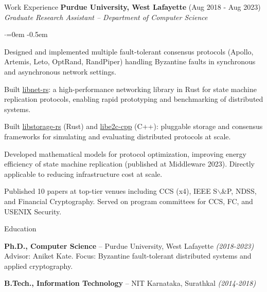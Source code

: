\documentclass{resume}
\begin{document}
\begin{rSection}{Work Experience}
\textbf{Purdue University, West Lafayette}  \hfill  (Aug 2018 - Aug 2023)\\
\emph{Graduate Research Assistant -- Department of Computer Science}
\begin{list}{$\cdot$}{\leftmargin=0em}
\itemsep -0.5em \vspace{-0.5em}
 \item  Designed and implemented multiple fault-tolerant consensus protocols (Apollo, Artemis, Leto, OptRand, RandPiper) handling Byzantine faults in synchronous and asynchronous network settings.
 \item  Built \href{https://github.com/libdist-rs/libnet-rs}{libnet-rs}: a high-performance networking library in Rust for state machine replication protocols, enabling rapid prototyping and benchmarking of distributed systems.
 \item  Built \href{https://github.com/libdist-rs/libstorage-rs}{libstorage-rs} (Rust) and \href{https://github.com/adithyabhatkajake/libe2c-cpp}{libe2c-cpp} (C++): pluggable storage and consensus frameworks for simulating and evaluating distributed protocols at scale.
 \item  Developed mathematical models for protocol optimization, improving energy efficiency of state machine replication (published at Middleware 2023). Directly applicable to reducing infrastructure cost at scale.
 \item  Published 10 papers at top-tier venues including CCS (x4), IEEE S$\backslash$&P, NDSS, and Financial Cryptography. Served on program committees for CCS, FC, and USENIX Security.
\end{list}
\vspace{0.5em}
\end{rSection}
\begin{rSection}{Education}
\label{sec:org6e41f16}
 \item  \textbf{Ph.D., Computer Science} -- Purdue University, West Lafayette  \hfill  \emph{(2018-2023)}\\
    Advisor: Aniket Kate. Focus: Byzantine fault-tolerant distributed systems and applied cryptography.

 \item  \textbf{B.Tech., Information Technology} -- NIT Karnataka, Surathkal  \hfill  \emph{(2014-2018)}
\end{rSection}
\end{document}
